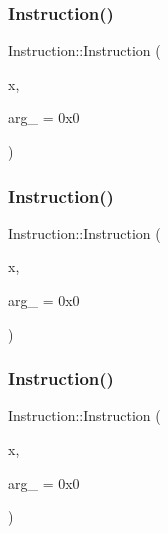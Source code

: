 \subsubsection{\texorpdfstring{Instruction()}{Instruction()}\hspace{0.1cm}{\footnotesize\ttfamily [2/4]}}
{\footnotesize\ttfamily Instruction\+::\+Instruction (\begin{DoxyParamCaption}\item[{\hyperlink{_instruction_8h_af2fb7c87c5854c5733d7bb0506b06de7}{Builtin\+Op}}]{x,  }\item[{int}]{arg\+\_\+ = {\ttfamily 0x0} }\end{DoxyParamCaption})\hspace{0.3cm}{\ttfamily [inline]}}

\mbox{\label{class_instruction_afbd8f0bdce88feee59e23abf82c8a718}} 
\subsubsection{\texorpdfstring{Instruction()}{Instruction()}\hspace{0.1cm}{\footnotesize\ttfamily [3/4]}}
{\footnotesize\ttfamily Instruction\+::\+Instruction (\begin{DoxyParamCaption}\item[{\hyperlink{_instruction_8h_a3a20ca4a8f0ab220518b030cc23ffee4}{Custom\+Op}}]{x,  }\item[{int}]{arg\+\_\+ = {\ttfamily 0x0} }\end{DoxyParamCaption})\hspace{0.3cm}{\ttfamily [inline]}}

\mbox{\label{class_instruction_a62d7782f809fa55635a6ced1e971eb3b}} 
\subsubsection{\texorpdfstring{Instruction()}{Instruction()}\hspace{0.1cm}{\footnotesize\ttfamily [4/4]}}
{\footnotesize\ttfamily Instruction\+::\+Instruction (\begin{DoxyParamCaption}\item[{\hyperlink{_instruction_8h_a227278394efd1e2313c727102db09ea9}{Primitive\+Op}}]{x,  }\item[{int}]{arg\+\_\+ = {\ttfamily 0x0} }\end{DoxyParamCaption})\hspace{0.3cm}{\ttfamily [inline]}}



